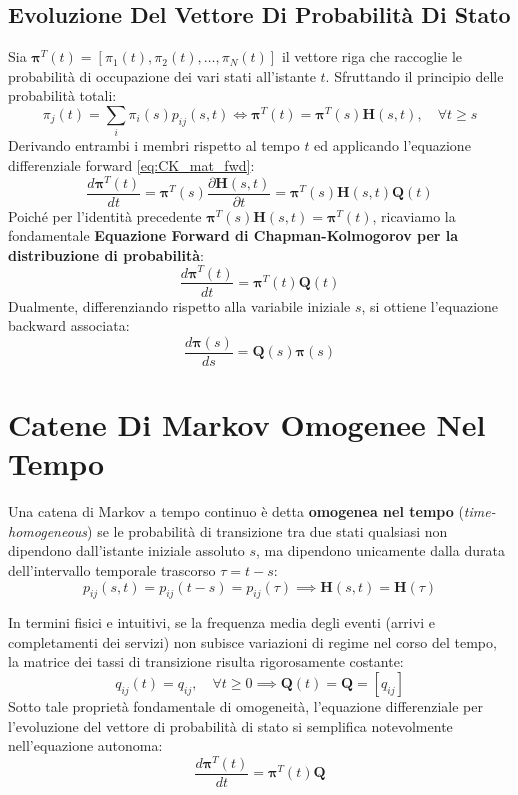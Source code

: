 \documentclass[11pt, a4paper]{article}
\begin{document}
\subsection{Evoluzione Del Vettore Di Probabilit\`a Di Stato}

Sia $\bm{\pi}^T(t) = [\pi_1(t), \pi_2(t), \dots, \pi_N(t)]$ il vettore riga che raccoglie le probabilità di occupazione dei vari stati all'istante $t$. Sfruttando il principio delle probabilità totali:
\[
    \pi_j(t) = \sum_{i} \pi_i(s) p_{ij}(s, t) \iff \bm{\pi}^T(t) = \bm{\pi}^T(s) \bm{H}(s, t), \quad \forall t \ge s
\]
Derivando entrambi i membri rispetto al tempo $t$ ed applicando l'equazione differenziale forward \eqref{eq:CK_mat_fwd}:
\[
    \frac{d \bm{\pi}^T(t)}{dt} = \bm{\pi}^T(s) \frac{\partial \bm{H}(s, t)}{\partial t} = \bm{\pi}^T(s) \bm{H}(s, t) \bm{Q}(t)
\]
Poiché per l'identità precedente $\bm{\pi}^T(s)\bm{H}(s, t) = \bm{\pi}^T(t)$, ricaviamo la fondamentale \textbf{Equazione Forward di Chapman-Kolmogorov per la distribuzione di probabilità}:
\[
    \boxed{\frac{d \bm{\pi}^T(t)}{dt} = \bm{\pi}^T(t) \bm{Q}(t)}
\]
Dualmente, differenziando rispetto alla variabile iniziale $s$, si ottiene l'equazione backward associata:
\[
    \boxed{\frac{d \bm{\pi}(s)}{ds} = \bm{Q}(s) \bm{\pi}(s)}
\]

\newpage


\section{Catene Di Markov Omogenee Nel Tempo}

Una catena di Markov a tempo continuo è detta \textbf{omogenea nel tempo} (\emph{time-homogeneous}) se le probabilità di transizione tra due stati qualsiasi non dipendono dall'istante iniziale assoluto $s$, ma dipendono unicamente dalla durata dell'intervallo temporale trascorso $\tau = t - s$:
\[
    p_{ij}(s, t) = p_{ij}(t - s) = p_{ij}(\tau) \implies \bm{H}(s, t) = \bm{H}(\tau)
\]

In termini fisici e intuitivi, se la frequenza media degli eventi (arrivi e completamenti dei servizi) non subisce variazioni di regime nel corso del tempo, la matrice dei tassi di transizione risulta rigorosamente costante:
\[
    q_{ij}(t) = q_{ij}, \quad \forall t \ge 0 \implies \bm{Q}(t) = \bm{Q} = [q_{ij}]
\]
Sotto tale proprietà fondamentale di omogeneità, l'equazione differenziale per l'evoluzione del vettore di probabilità di stato si semplifica notevolmente nell'equazione autonoma:
\[
    \boxed{\frac{d \bm{\pi}^T(t)}{dt} = \bm{\pi}^T(t) \bm{Q}}
\]
\end{document}
